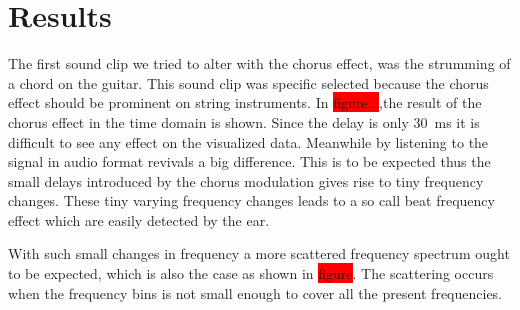 

\section{Results}
The first sound clip we tried to alter with the chorus effect, was the strumming of a chord on the guitar. This sound clip was specific selected because the chorus effect should be prominent on string instruments. 
In \colorbox{red}{figure...},the result of the chorus effect in the time domain is shown. Since the delay is only \SI{30}{\milli\second} it is difficult to see any effect on the visualized data. Meanwhile by listening to the signal in audio format revivals a big difference. This is to be expected thus the small delays introduced by the chorus modulation gives rise to tiny frequency changes. These tiny varying frequency changes leads to a so call beat frequency effect which are easily detected by the ear.

With such small changes in frequency a more scattered frequency spectrum ought to be expected, which is also the case as shown in \colorbox{red}{figure}. The scattering occurs when the frequency bins is not small enough to cover all the present frequencies.
   






